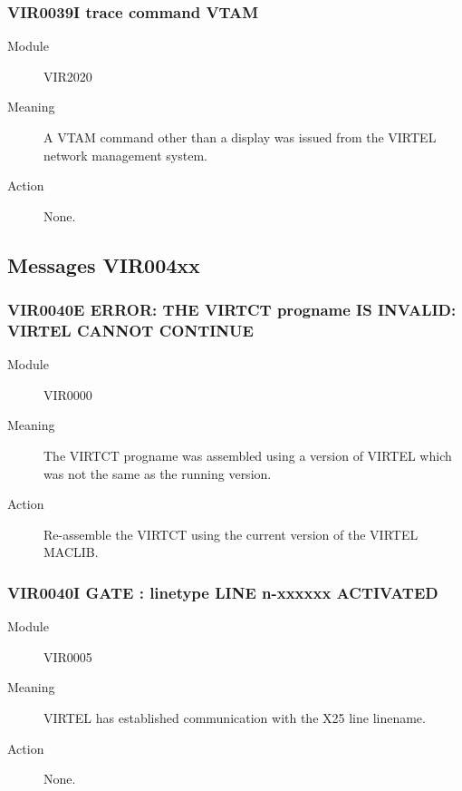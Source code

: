 \documentclass[letterpaper,10pt,english]{sphinxmanual}
\begin{document}
\subsubsection{VIR0039I trace command VTAM}
\label{\detokenize{messages:vir0039i-trace-command-vtam}}\begin{description}
\item[{Module}] \leavevmode
VIR2020

\item[{Meaning}] \leavevmode
A VTAM command other than a display was issued from the VIRTEL network management system.

\item[{Action}] \leavevmode
None.

\end{description}


\subsection{Messages VIR004xx}
\label{\detokenize{messages:messages-vir004xx}}

\subsubsection{VIR0040E ERROR: THE VIRTCT progname IS INVALID: VIRTEL CANNOT CONTINUE}
\label{\detokenize{messages:vir0040e-error-the-virtct-progname-is-invalid-virtel-cannot-continue}}\begin{description}
\item[{Module}] \leavevmode
VIR0000

\item[{Meaning}] \leavevmode
The VIRTCT progname was assembled using a version of VIRTEL which was not the same as the running version.

\item[{Action}] \leavevmode
Re-assemble the VIRTCT using the current version of the VIRTEL MACLIB.

\end{description}


\subsubsection{VIR0040I GATE : linetype LINE n-xxxxxx ACTIVATED}
\label{\detokenize{messages:vir0040i-gate-linetype-line-n-xxxxxx-activated}}\begin{description}
\item[{Module}] \leavevmode
VIR0005

\item[{Meaning}] \leavevmode
VIRTEL has established communication with the X25 line linename.

\item[{Action}] \leavevmode
None.

\end{description}
\end{document}
